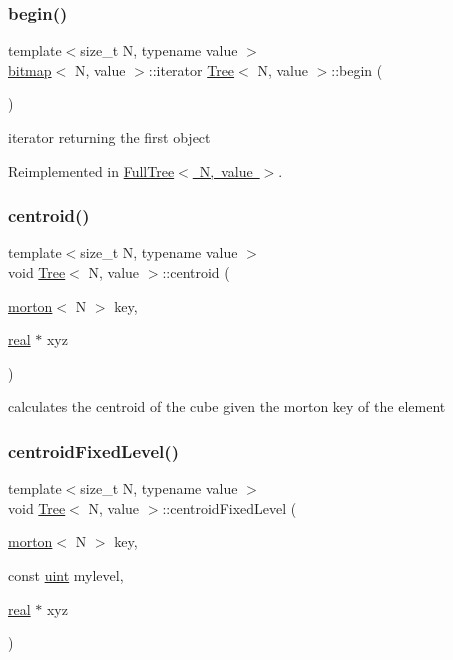 \subsubsection{\texorpdfstring{begin()}{begin()}}
{\footnotesize\ttfamily template$<$size\+\_\+t N, typename value $>$ \\
\mbox{\hyperlink{definitions_8h_acf2396ef4de9eb8a6324b9f1a624ea85}{bitmap}}$<$ N, value $>$\+::iterator \mbox{\hyperlink{classTree}{Tree}}$<$ N, value $>$\+::begin (\begin{DoxyParamCaption}{ }\end{DoxyParamCaption})\hspace{0.3cm}{\ttfamily [virtual]}}

iterator returning the first object 

Reimplemented in \mbox{\hyperlink{classFullTree_af2fbecbd352a329634a6fdc35f519968}{Full\+Tree$<$ N, value $>$}}.

\mbox{\label{classTree_aea583de3932917fd2cfbcd2d09318363}} 
\subsubsection{\texorpdfstring{centroid()}{centroid()}}
{\footnotesize\ttfamily template$<$size\+\_\+t N, typename value $>$ \\
void \mbox{\hyperlink{classTree}{Tree}}$<$ N, value $>$\+::centroid (\begin{DoxyParamCaption}\item[{\mbox{\hyperlink{definitions_8h_af8682350bd8bb38ee9023f7a0a310add}{morton}}$<$ N $>$}]{key,  }\item[{\mbox{\hyperlink{definitions_8h_aedc0ad84d1e764530814f57ad931d02a}{real}} $\ast$}]{xyz }\end{DoxyParamCaption})}

calculates the centroid of the cube given the morton key of the element \mbox{\label{classTree_a50c5721c4b9535029e4700419bec234c}} 
\subsubsection{\texorpdfstring{centroid\+Fixed\+Level()}{centroidFixedLevel()}}
{\footnotesize\ttfamily template$<$size\+\_\+t N, typename value $>$ \\
void \mbox{\hyperlink{classTree}{Tree}}$<$ N, value $>$\+::centroid\+Fixed\+Level (\begin{DoxyParamCaption}\item[{\mbox{\hyperlink{definitions_8h_af8682350bd8bb38ee9023f7a0a310add}{morton}}$<$ N $>$}]{key,  }\item[{const \mbox{\hyperlink{definitions_8h_a69aa29b598b851b0640aa225a9e5d61d}{uint}}}]{mylevel,  }\item[{\mbox{\hyperlink{definitions_8h_aedc0ad84d1e764530814f57ad931d02a}{real}} $\ast$}]{xyz }\end{DoxyParamCaption})}

